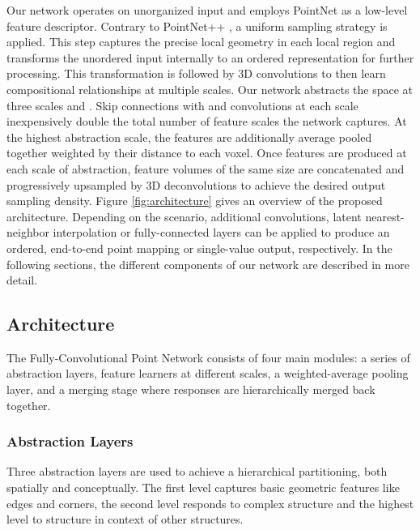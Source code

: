 \documentclass[runningheads]{llncs}
\begin{document}
\noindent
Our network operates on unorganized input and employs PointNet \cite{Qi2017} as a low-level feature descriptor. Contrary to PointNet++ \cite{Qi2017_2}, a uniform sampling strategy is applied. This step captures the precise local geometry in each local region and transforms the unordered input internally to an ordered representation for further processing. This transformation is followed by 3D convolutions to then learn compositional relationships at multiple scales. Our network abstracts the space at three scales  and . Skip connections with  and  convolutions at each scale inexpensively double the total number of feature scales the network captures. At the highest abstraction scale, the features are additionally average pooled together weighted by their distance to each voxel. Once features are produced at each scale of abstraction, feature volumes of the same size are concatenated and progressively upsampled by 3D deconvolutions to achieve the desired output sampling density. Figure \ref{fig:architecture} gives an overview of the proposed architecture. Depending on the scenario, additional convolutions, latent nearest-neighbor interpolation or fully-connected layers can be applied to produce an ordered, end-to-end point mapping or single-value output, respectively. In the following sections, the different components of our network are described in more detail.\\

\subsection{Architecture}

The Fully-Convolutional Point Network consists of four main modules: a series of abstraction layers, feature learners at different scales, a weighted-average pooling layer, and a merging stage where responses are hierarchically merged back together.

\subsubsection{Abstraction Layers}
Three abstraction layers are used to achieve a hierarchical partitioning, both spatially and conceptually. The first level captures basic geometric features like edges and corners, the second level responds to complex structure and the highest level to structure in context of other structures.\\
\end{document}

